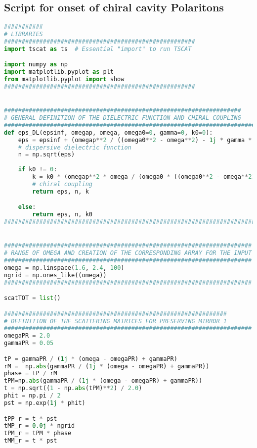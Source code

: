 \documentclass[aps,prl,10pt,onecolumn,superscriptaddress]{revtex4-2}
\begin{document}
\subsection{Script for onset of chiral cavity Polaritons}
\begin{lstlisting}[language=Python, caption=Script for Figure 15]
###########
# LIBRARIES
######################################################
import tscat as ts  # Essential "import" to run TSCAT

import numpy as np
import matplotlib.pyplot as plt
from matplotlib.pyplot import show
######################################################


###################################################################
# GENERAL DEFINITION OF THE DIELECTRIC FUNCTION AND CHIRAL COUPLING
################################################################################################
def eps_DL(epsinf, omegap, omega, omega0=0, gamma=0, k0=0):
    eps = epsinf + (omegap**2 / ((omega0**2 - omega**2) - 1j * gamma * omega))  
    # dispersive dielectric function
    n = np.sqrt(eps)
    
    if k0 != 0:
        k = k0 * (omegap**2 * omega / (omega0 * ((omega0**2 - omega**2) - 1j * gamma * omega)))  
        # chiral coupling
        return eps, n, k

    else:
        return eps, n, k0
#################################################################################################


######################################################################
# RANGE OF OMEGA AND CREATION OF THE CORRESPONDING ARRAY FOR THE INPUT
######################################################################
omega = np.linspace(1.6, 2.4, 100)
ngrid = np.ones_like((omega))
######################################################################

scatTOT = list()

###############################################################
# DEFINITION OF THE SCATTERING MATRICES FOR PRESERVING MIRROR 1
######################################################################
omegaPR = 2.0
gammaPR = 0.05

tP = gammaPR / (1j * (omega - omegaPR) + gammaPR)
rM =  np.abs(gammaPR / (1j * (omega - omegaPR) + gammaPR))
phase = tP / rM
tPM=np.abs(gammaPR / (1j * (omega - omegaPR) + gammaPR))
t = np.sqrt((1 - np.abs(tPM)**2) / 2.0)
phit = np.pi / 2
pst = np.exp(1j * phit)

tPP_r = t * pst 
tMP_r = 0.0j * ngrid
tPM_r = tPM * phase 
tMM_r = t * pst


\end{lstlisting}
\end{document}

